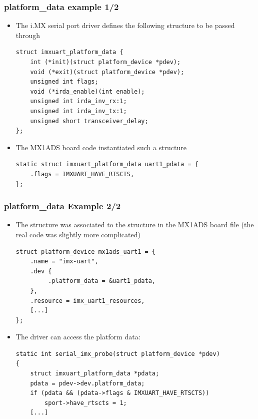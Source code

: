 \begin{frame}[fragile]
  \frametitle{platform\_data example 1/2}
  \begin{itemize}
  \item The i.MX serial port driver defines the following structure to
    be passed through 
    \begin{block}{}
  \begin{verbatim}
struct imxuart_platform_data {
    int (*init)(struct platform_device *pdev);
    void (*exit)(struct platform_device *pdev);
    unsigned int flags;
    void (*irda_enable)(int enable);
    unsigned int irda_inv_rx:1;
    unsigned int irda_inv_tx:1;
    unsigned short transceiver_delay;
};
  \end{verbatim}
  \end{block}
  \item The MX1ADS board code instantiated such a structure
    \begin{block}{}
  \begin{verbatim}
static struct imxuart_platform_data uart1_pdata = {
    .flags = IMXUART_HAVE_RTSCTS,
};
  \end{verbatim}
  \end{block}
  \end{itemize}
\end{frame}

\begin{frame}[fragile]
  \frametitle{platform\_data Example 2/2}
  \begin{itemize}
  \item The  structure was associated to the
     structure in the MX1ADS board file (the
    real code was slightly more complicated)
    \begin{block}{}
  \begin{verbatim}
struct platform_device mx1ads_uart1 = {
    .name = "imx-uart",
    .dev {
         .platform_data = &uart1_pdata,
    },
    .resource = imx_uart1_resources,
    [...]
};
  \end{verbatim}
  \end{block}
  \item The driver can access the platform data:
    \begin{block}{}
  \begin{verbatim}
static int serial_imx_probe(struct platform_device *pdev)
{
    struct imxuart_platform_data *pdata;
    pdata = pdev->dev.platform_data;
    if (pdata && (pdata->flags & IMXUART_HAVE_RTSCTS))
        sport->have_rtscts = 1;
    [...]
  \end{verbatim}
  \end{block}
\end{itemize}
\end{frame}

